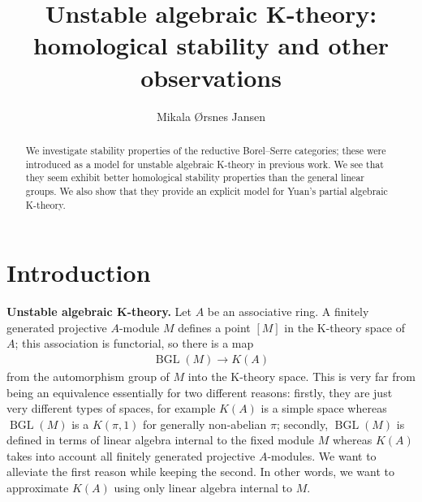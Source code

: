 \documentclass[12pt, reqno]{amsart}
\theoremstyle{plain}
\theoremstyle{definition}
\begin{document}
\title{Unstable algebraic K-theory: homological stability and other observations}
\author{Mikala Ørsnes Jansen}


\begin{abstract}
We investigate stability properties of the reductive Borel--Serre categories; these were introduced as a model for unstable algebraic K-theory in previous work. We see that they seem exhibit better homological stability properties than the general linear groups. We also show that they provide an explicit model for Yuan's partial algebraic K-theory.
\end{abstract}

\maketitle

\tableofcontents

\section{Introduction}

\textbf{Unstable algebraic K-theory.} Let $A$ be an associative ring. A finitely generated projective $A$-module $M$ defines a point $[M]$ in the K-theory space of $A$; this association is functorial, so there is a map
\begin{align*}
\operatorname{BGL}(M)\rightarrow K(A)
\end{align*}
from the automorphism group of $M$ into the K-theory space. This is very far from being an equivalence essentially for two different reasons: firstly, they are just very different types of spaces, for example $K(A)$ is a simple space whereas $\operatorname{BGL}(M)$ is a $K(\pi,1)$ for generally non-abelian $\pi$; secondly, $\operatorname{BGL}(M)$ is defined in terms of linear algebra internal to the fixed module $M$ whereas $K(A)$ takes into account all finitely generated projective $A$-modules. We want to alleviate the first reason while keeping the second. In other words, we want to approximate $K(A)$ using only linear algebra internal to $M$.
\end{document}
